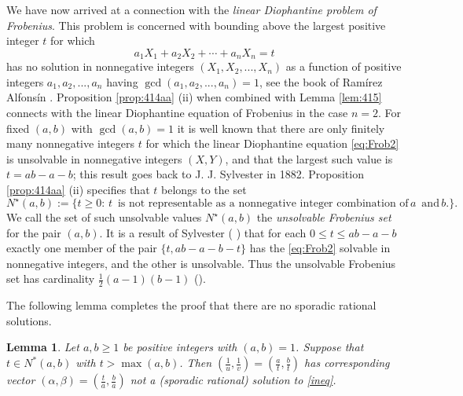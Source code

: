 \documentclass[12pt,letterpaper, reqno]{amsart}
\newtheorem{lem}[thm]{Lemma}
\theoremstyle{definition}
\theoremstyle{remark}
\begin{document}
We  have now arrived at a connection with the {\em linear Diophantine problem of Frobenius}. 
This problem  is concerned with bounding above the largest positive  integer $t$ for which
\begin{equation}\label{Frobenius-eqn}
a_1 X_1 + a_2 X_2 + \cdots + a_n X_n = t
\end{equation}
has no solution in nonnegative integers $(X_1, X_2, ..., X_n)$
as a function of  positive integers $a_1, a_2, ... , a_n$ having $\gcd(a_1, a_2, ..., a_n) =1$,
see the book of Ram\'{i}rez Alfons\'{i}n \cite{RA05}. 
Proposition \ref{prop:414aa} (ii) when combined with Lemma \ref{lem:415} connects  with the linear Diophantine equation of Frobenius
in the case $n=2$.
For fixed $(a, b)$ with $\gcd(a, b)=1$ it is well known 
 that  there are only
finitely many nonnegative integers $t$ for which the linear Diophantine equation \eqref{eq:Frob2} is unsolvable in nonnegative
integers $(X, Y)$, and  that the  largest such value is $t= ab -a -b$; this result goes back to J. J. Sylvester in 1882.
Proposition \ref{prop:414aa} (ii)  specifies that  $t$  belongs to  the set
$$
N^{\star}(a, b) := \{ t \ge 0: \, t \, \mbox{ is not representable as a nonnegative integer combination of}\,  a \, \mbox{ and} \, b.\}.
$$
 We call the set of
such unsolvable values $N^{\star}(a, b)$
the {\em unsolvable Frobenius set} for the pair $(a, b)$.
It is  a result of Sylvester (\cite{Sylvester:1882} \cite{Sylvester:1884})
that  for 
each $0\le t \le ab-a-b$  exactly one member of the pair $\{ t, ab-a- b-t \}$ has the
\eqref{eq:Frob2}  solvable in nonnegative integers, and the other is unsolvable. Thus the unsolvable Frobenius set
has cardinality $\frac{1}{2} (a-1)(b-1)$ (\cite[Theorem 5.1.1]{RA05}).

The following lemma completes the proof  that there are no sporadic rational solutions. 
\begin{lem}\label{lem:416}
Let $a, b \ge 1$ be positive integers with  $(a, b) =1$.
Suppose that $t\in N^{*}(a,b)$ with  $t>\max(a,b)$. Then $(\frac{1}{u} ,\frac{1}{v}) = (\frac{a}{t}, \frac{b}{t})$ has corresponding 
vector $(\alpha, \beta) = (\frac{t}{a}, \frac{b}{a})$  not a (sporadic rational) 
solution to \eqref{ineq}. 
\end{lem}
\end{document}
